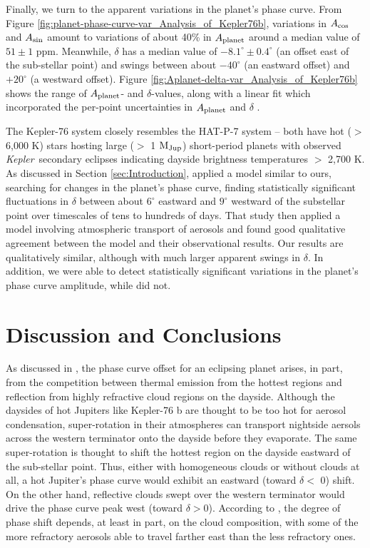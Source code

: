 \documentclass[manuscript]{aastex62}
\newcommand{\kepler}{{\it Kepler}}
\begin{document}
Finally, we turn to the apparent variations in the planet's phase curve. From Figure \ref{fig:planet-phase-curve-var_Analysis_of_Kepler76b}, variations in $A_{\rm cos}$ and $A_{\rm sin}$ amount to variations of about 40\% in $A_{\rm planet}$ around a median value of $51 \pm 1$ ppm. Meanwhile, $\delta$ has a median value of $-8.1^\circ \pm 0.4^\circ$ (an offset east of the sub-stellar point) and swings between about $-40^\circ$ (an eastward offset) and $+20^\circ$ (a westward offset). Figure \ref{fig:Aplanet-delta-var_Analysis_of_Kepler76b} shows the range of $A_{\rm planet}$- and $\delta$-values, along with a linear fit which incorporated the per-point uncertainties in $A_{\rm planet}$ and $\delta$ \citep{boggs1990orthogonal}.

The Kepler-76 system closely resembles the HAT-P-7 system -- both have hot ($>$ 6,000 K) stars hosting large ($>$ 1 ${\rm M_{Jup}}$) short-period planets with observed \kepler\ secondary eclipses indicating dayside brightness temperatures $>$ 2,700 K. As discussed in Section \ref{sec:Introduction}, \citet{2016NatAs...1E...4A} applied a model similar to ours, searching for changes in the planet's phase curve, finding statistically significant fluctuations in $\delta$ between about $6^\circ$ eastward and $9^\circ$ westward of the substellar point over timescales of tens to hundreds of days. That study then applied a model involving atmospheric transport of aerosols and found good qualitative agreement between the model and their observational results. Our results are qualitatively similar, although with much larger apparent swings in $\delta$. In addition, we were able to detect statistically significant variations in the planet's phase curve amplitude, while \citet{2016NatAs...1E...4A} did not.

\section{Discussion and Conclusions}
\label{sec:Discussion}


As discussed in \citet{2016ApJ...828...22P}, the phase curve offset for an eclipsing planet arises, in part, from the competition between thermal emission from the hottest regions and reflection from highly refractive cloud regions on the dayside. Although the daysides of hot Jupiters like Kepler-76 b are thought to be too hot for aerosol condensation, super-rotation in their atmospheres can transport nightside aersols across the western terminator onto the dayside before they evaporate. The same super-rotation is thought to shift the hottest region on the dayside eastward of the sub-stellar point. Thus, either with homogeneous clouds or without clouds at all, a hot Jupiter's phase curve would exhibit an eastward (toward $\delta <$ 0) shift. On the other hand, reflective clouds swept over the western terminator would drive the phase curve peak west (toward $\delta > 0$). According to \citet{2016ApJ...828...22P}, the degree of phase shift depends, at least in part, on the cloud composition, with some of the more refractory aerosols able to travel farther east than the less refractory ones. 
\end{document}
